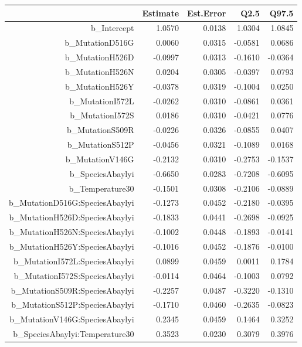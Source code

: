 \begin{table}[ht]
\centering
\begingroup\footnotesize
\begin{tabular}{rrrrr}
  \hline
 & Estimate & Est.Error & Q2.5 & Q97.5 \\ 
  \hline
b\_Intercept & 1.0570 & 0.0138 & 1.0304 & 1.0845 \\ 
  b\_MutationD516G & 0.0060 & 0.0315 & -0.0581 & 0.0686 \\ 
  b\_MutationH526D & -0.0997 & 0.0313 & -0.1610 & -0.0364 \\ 
  b\_MutationH526N & 0.0204 & 0.0305 & -0.0397 & 0.0793 \\ 
  b\_MutationH526Y & -0.0378 & 0.0319 & -0.1004 & 0.0250 \\ 
  b\_MutationI572L & -0.0262 & 0.0310 & -0.0861 & 0.0361 \\ 
  b\_MutationI572S & 0.0186 & 0.0310 & -0.0421 & 0.0776 \\ 
  b\_MutationS509R & -0.0226 & 0.0326 & -0.0855 & 0.0407 \\ 
  b\_MutationS512P & -0.0456 & 0.0321 & -0.1089 & 0.0168 \\ 
  b\_MutationV146G & -0.2132 & 0.0310 & -0.2753 & -0.1537 \\ 
  b\_SpeciesAbaylyi & -0.6650 & 0.0283 & -0.7208 & -0.6095 \\ 
  b\_Temperature30 & -0.1501 & 0.0308 & -0.2106 & -0.0889 \\ 
  b\_MutationD516G:SpeciesAbaylyi & -0.1273 & 0.0452 & -0.2180 & -0.0395 \\ 
  b\_MutationH526D:SpeciesAbaylyi & -0.1833 & 0.0441 & -0.2698 & -0.0925 \\ 
  b\_MutationH526N:SpeciesAbaylyi & -0.1002 & 0.0448 & -0.1893 & -0.0141 \\ 
  b\_MutationH526Y:SpeciesAbaylyi & -0.1016 & 0.0452 & -0.1876 & -0.0100 \\ 
  b\_MutationI572L:SpeciesAbaylyi & 0.0899 & 0.0459 & 0.0011 & 0.1784 \\ 
  b\_MutationI572S:SpeciesAbaylyi & -0.0114 & 0.0464 & -0.1003 & 0.0792 \\ 
  b\_MutationS509R:SpeciesAbaylyi & -0.2257 & 0.0487 & -0.3220 & -0.1310 \\ 
  b\_MutationS512P:SpeciesAbaylyi & -0.1710 & 0.0460 & -0.2635 & -0.0823 \\ 
  b\_MutationV146G:SpeciesAbaylyi & 0.2345 & 0.0459 & 0.1464 & 0.3252 \\ 
  b\_SpeciesAbaylyi:Temperature30 & 0.3523 & 0.0230 & 0.3079 & 0.3976 \\ 

\end{tabular}
\end{table}
